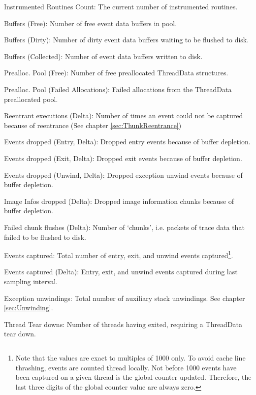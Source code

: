 \begin{compactitem}
	\item Instrumented Routines Count: The current number of instrumented routines.
	\item Buffers (Free): Number of free event data buffers in pool.
	\item Buffers (Dirty): Number of dirty event data buffers waiting to be flushed to disk.
	\item Buffers (Collected): Number of event data buffers written to disk.
	\item Prealloc. Pool (Free): Number of free preallocated ThreadData structures.
	\item Prealloc. Pool (Failed Allocations): Failed allocations from the ThreadData preallocated pool.
	\item Reentrant executions (Delta): Number of times an event could not be captured because
				of reentrance (See chapter \ref{sec:ThunkReentrance})
	\item Events dropped (Entry, Delta): Dropped entry events because of buffer depletion.
	\item Events dropped (Exit, Delta): Dropped exit events because of buffer depletion.
	\item Events dropped (Unwind, Delta): Dropped exception unwind events because of buffer depletion.
	\item Image Infos dropped (Delta): Dropped image information chunks because of buffer depletion.
	\item Failed chunk flushes (Delta): Number of `chunks', i.e. packets of trace data that failed
				to be flushed to disk.
	\item Events captured: Total number of entry, exit, and unwind events captured\footnote{Note that the
				values are exact to multiples of 1000 only. To avoid cache line thrashing, events are counted 
				thread locally. Not before 1000 events have been captured on a given thread is the global 
				counter updated. Therefore, the last three digits of the global counter value are always zero.}.
	\item Events captured (Delta): Entry, exit, and unwind events captured during last sampling interval.
	\item Exception unwindings: Total number of auxiliary stack unwindings. See chapter \ref{sec:Unwinding}.
	\item Thread Tear downs: Number of threads having exited, requiring a ThreadData tear down.
\end{compactitem}

